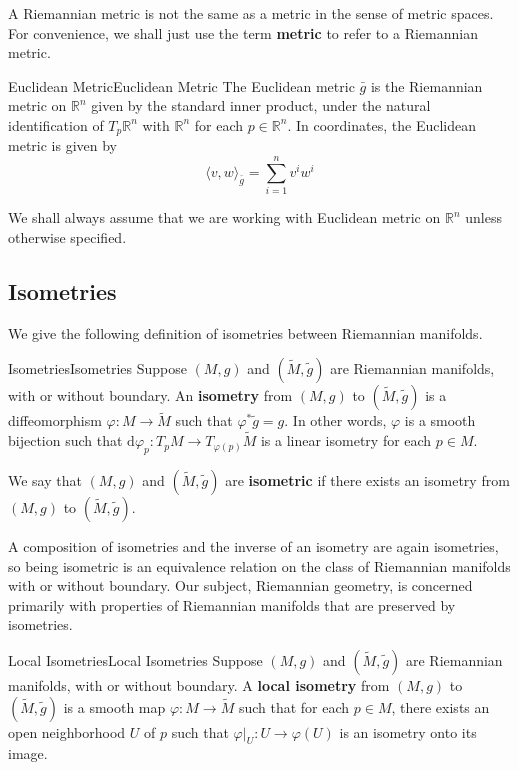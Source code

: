 \documentclass[../main.tex]{subfiles}
\begin{document}
\begin{remark}
	A Riemannian metric is not the same as a metric in the sense of metric spaces. For convenience, we shall just use the term \textbf{metric} to refer to a Riemannian metric.
\end{remark}

\begin{example}{Euclidean Metric}{Euclidean Metric}
	The Euclidean metric $\bar{g}$ is the Riemannian metric on $\mathbb{R}^n$ given by the standard inner product, under the natural identification of $T_p\mathbb{R}^n$ with $\mathbb{R}^n$ for each $p \in \mathbb{R}^n$. In coordinates, the Euclidean metric is given by
	\begin{equation*}
		\langle v, w \rangle_{\bar{g}} = \sum_{i=1}^n v^i w^i
	\end{equation*}
\end{example}
We shall always assume that we are working with Euclidean metric on $\mathbb{R}^n$ unless otherwise specified.

\subsection{Isometries}

We give the following definition of isometries between Riemannian manifolds.
\begin{definition}{Isometries}{Isometries}
	Suppose $(M, g)$ and $(\tilde{M}, \tilde{g})$ are Riemannian manifolds, with or without boundary. An \textbf{isometry} from $(M, g)$ to $(\tilde{M}, \tilde{g})$ is a diffeomorphism $\varphi: M \to \tilde{M}$ such that $\varphi^*\tilde{g} = g$. In other words, $\varphi$ is a smooth bijection such that $\mathrm{d} \varphi_p: T_pM \to T_{\varphi(p)}\tilde{M}$ is a linear isometry for each $p \in M$.

	We say that $(M, g)$ and $(\tilde{M}, \tilde{g})$ are \textbf{isometric} if there exists an isometry from $(M, g)$ to $(\tilde{M}, \tilde{g})$.
\end{definition}

A composition of isometries and the inverse of an isometry are again isometries, so being isometric is an equivalence relation on the class of Riemannian manifolds with or without boundary. Our subject, Riemannian geometry, is concerned primarily with properties of Riemannian manifolds that are preserved by isometries.

\begin{definition}{Local Isometries}{Local Isometries}
	Suppose $(M, g)$ and $(\tilde{M}, \tilde{g})$ are Riemannian manifolds, with or without boundary. A \textbf{local isometry} from $(M, g)$ to $(\tilde{M}, \tilde{g})$ is a smooth map $\varphi: M \to \tilde{M}$ such that for each $p \in M$, there exists an open neighborhood $U$ of $p$ such that $\varphi|_U: U \to \varphi(U)$ is an isometry onto its image.
\end{definition}
\end{document}
